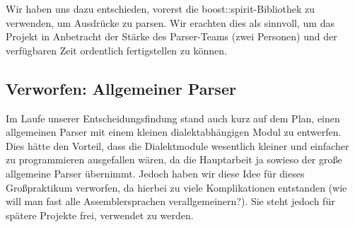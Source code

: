 \documentclass[a4paper]{article}
\begin{document}
Wir haben uns dazu entschieden, vorerst die boost::spirit-Bibliothek zu verwenden, um Ausdrücke zu parsen.
Wir erachten dies als sinnvoll, um das Projekt in Anbetracht der Stärke des Parser-Teams (zwei Personen) und der verfügbaren Zeit ordentlich fertigstellen zu können.
\subsection{Verworfen: Allgemeiner Parser}
Im Laufe unserer Entscheidungsfindung stand auch kurz auf dem Plan, einen allgemeinen Parser mit einem kleinen dialektabhängigen Modul zu entwerfen.
Dies hätte den Vorteil, dass die Dialektmodule wesentlich kleiner und einfacher zu programmieren ausgefallen wären, da die Hauptarbeit ja sowieso der große allgemeine Parser übernimmt.
Jedoch haben wir diese Idee für dieses Großpraktikum verworfen, da hierbei zu viele Komplikationen entstanden (wie will man fast alle Assemblersprachen verallgemeinern?).
Sie steht jedoch für spätere Projekte frei, verwendet zu werden.
\end{document}
